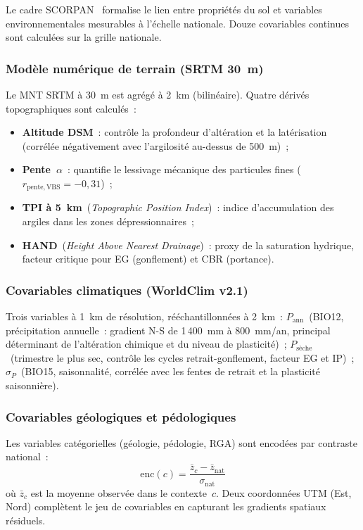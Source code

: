 \documentclass[10pt,a4paper,twocolumn]{article}
\begin{document}
	Le cadre SCORPAN~\cite{mcbratney2003digital} formalise le lien
	entre propriétés du sol et variables environnementales mesurables
	à l'échelle nationale.
	Douze covariables continues sont calculées sur la grille nationale.
	
	\subsubsection{Modèle numérique de terrain (SRTM 30~m)}
	
	Le MNT SRTM à 30~m est agrégé à 2~km (bilinéaire).
	Quatre dérivés topographiques sont calculés~:
	\begin{itemize}[noitemsep]
		\item \textbf{Altitude DSM}~: contrôle la profondeur d'altération et
		la latérisation (corrélée négativement avec l'argilosité au-dessus
		de 500~m)~;
		\item \textbf{Pente~$\alpha$}~: quantifie le lessivage mécanique des
		particules fines ($r_{\mathrm{pente,VBS}}=-0{,}31$)~;
		\item \textbf{TPI à 5~km}~(\textit{Topographic Position Index})~:
		indice d'accumulation des argiles dans les zones dépressionnaires~;
		\item \textbf{HAND}~(\textit{Height Above Nearest Drainage})~:
		proxy de la saturation hydrique, facteur critique pour EG
		(gonflement) et CBR (portance).
	\end{itemize}
	
	\subsubsection{Covariables climatiques (WorldClim v2.1)}
	
	Trois variables à 1~km de résolution, rééchantillonnées à 2~km~:
	$P_{\mathrm{ann}}$~(BIO12, précipitation annuelle~: gradient N-S
	de 1\,400~mm à 800~mm/an, principal déterminant de l'altération
	chimique et du niveau de plasticité)~;
	$P_{\mathrm{sèche}}$~(trimestre le plus sec, contrôle les cycles
	retrait-gonflement, facteur EG et IP)~;
	$\sigma_P$~(BIO15, saisonnalité, corrélée avec les fentes de
	retrait et la plasticité saisonnière).
	
	\subsubsection{Covariables géologiques et pédologiques}
	
	Les variables catégorielles (géologie, pédologie, RGA) sont encodées
	par contraste national~:
	\begin{equation}
		\mathrm{enc}(c)=\frac{\bar{z}_c-\bar{z}_{\mathrm{nat}}}{\sigma_{\mathrm{nat}}}
		\label{eq:encoding}
	\end{equation}
	où $\bar{z}_c$ est la moyenne observée dans le contexte~$c$.
	Deux coordonnées UTM (Est, Nord) complètent le jeu de covariables
	en capturant les gradients spatiaux résiduels.
	
\end{document}
